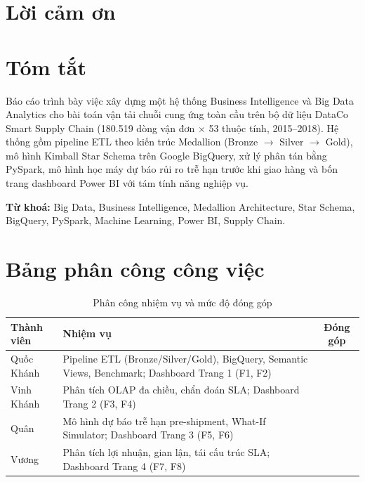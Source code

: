 \chapter*{Lời cảm ơn}

\chapter*{Tóm tắt}
Báo cáo trình bày việc xây dựng một hệ thống Business Intelligence và Big Data Analytics
cho bài toán vận tải chuỗi cung ứng toàn cầu trên bộ dữ liệu DataCo Smart Supply Chain
(180.519 dòng vận đơn $\times$ 53 thuộc tính, 2015--2018). Hệ thống gồm pipeline ETL theo
kiến trúc Medallion (Bronze $\rightarrow$ Silver $\rightarrow$ Gold), mô hình Kimball Star Schema
trên Google BigQuery, xử lý phân tán bằng PySpark, mô hình học máy dự báo rủi ro trễ hạn
trước khi giao hàng và bốn trang dashboard Power BI với tám tính năng nghiệp vụ.

\noindent\textbf{Từ khoá:} Big Data, Business Intelligence, Medallion Architecture, Star Schema,
BigQuery, PySpark, Machine Learning, Power BI, Supply Chain.

\chapter*{Bảng phân công công việc}
\begin{table}[H]
\centering
\caption{Phân công nhiệm vụ và mức độ đóng góp}
\begin{tabularx}{\linewidth}{|l|X|c|}
\hline
\textbf{Thành viên} & \textbf{Nhiệm vụ} & \textbf{Đóng góp} \\ \hline
Quốc Khánh & Pipeline ETL (Bronze/Silver/Gold), BigQuery, Semantic Views, Benchmark; Dashboard Trang 1 (F1, F2) & \todo{\%} \\ \hline
Vinh Khánh & Phân tích OLAP đa chiều, chẩn đoán SLA; Dashboard Trang 2 (F3, F4) & \todo{\%} \\ \hline
Quân & Mô hình dự báo trễ hạn pre-shipment, What-If Simulator; Dashboard Trang 3 (F5, F6) & \todo{\%} \\ \hline
Vương & Phân tích lợi nhuận, gian lận, tái cấu trúc SLA; Dashboard Trang 4 (F7, F8) & \todo{\%} \\ \hline
\end{tabularx}
\end{table}
